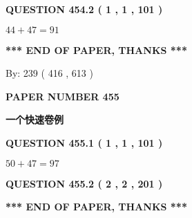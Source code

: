 \documentclass{ctexart}
\begin{document}
  
  
\vspace{0.2in}
  
{\textbf{\Large{QUESTION
454.2 
 ( 1 , 1 , 101 )
}}}
  
  
 
 

$ %
44 +  %
47=   %
91$
 
 
   
   
 \vspace{0.2in}
 
   
   
   
   
\vspace{1.0in} 
{\textbf{\large{ *** END OF PAPER, THANKS *** }}} 
   
   
\hspace{1.0in} By: 
 239 ( 416 ,  613 )
   
   
   
   
\newpage 
\setcounter{page}{ 
   455001 } 
   
   
   
   
 {\textbf{ \Large{ PAPER NUMBER  455  }}}
   
   
\vspace{0.2in}
   
   
   
   
   
   
 \vspace{0.2in}
{\LARGE {\textbf{ 一个快速卷例}}}
   
   
  
\vspace{0.2in}
  
{\textbf{\Large{QUESTION
455.1 
 ( 1 , 1 , 101 )
}}}
  
  
 
 

$ %
50 +  %
47=   %
97$
 
 
  
\vspace{0.2in}
  
{\textbf{\Large{QUESTION
455.2 
 ( 2 , 2 , 201 )
}}}
  
  
   
   
 \vspace{0.2in}
 
   
   
   
   
\vspace{1.0in} 
{\textbf{\large{ *** END OF PAPER, THANKS *** }}} 
   
\end{document}
